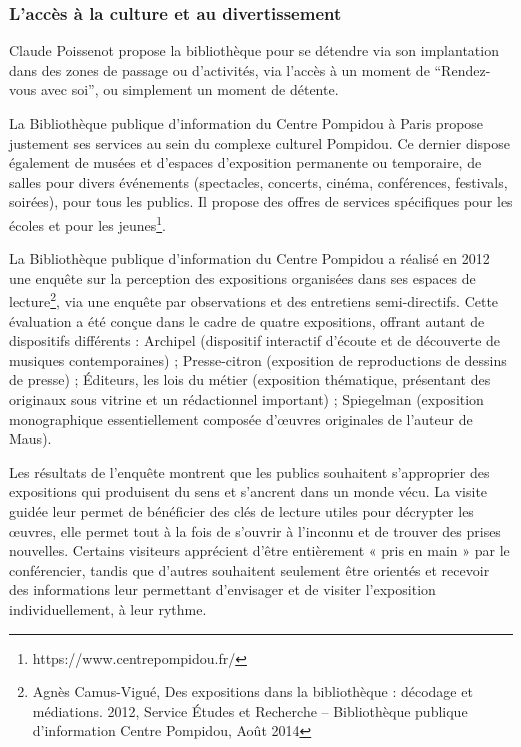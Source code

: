 \documentclass[french,a4paper,12pt]{article}
\begin{document}
\subsubsection{L’accès à la culture et au divertissement}

\quad Claude Poissenot  propose la bibliothèque pour se détendre via son implantation dans des zones de passage ou d’activités, via l’accès à un moment de “Rendez-vous avec soi”, ou simplement un moment de détente. 

La Bibliothèque publique d’information du Centre Pompidou à Paris propose justement ses services au sein du complexe culturel Pompidou. Ce dernier dispose également de musées et d’espaces d’exposition permanente ou temporaire, de salles pour divers événements (spectacles, concerts, cinéma, conférences, festivals, soirées), pour tous les publics. Il propose des offres de services spécifiques pour les écoles et pour les jeunes\footnote{https://www.centrepompidou.fr/}. 

\quad La Bibliothèque publique d’information du Centre Pompidou a réalisé en 2012 une enquête sur la perception des expositions organisées dans ses espaces de lecture\footnote{Agnès Camus-Vigué, Des expositions dans la bibliothèque : décodage et médiations. 2012, Service Études et Recherche – Bibliothèque publique d'information Centre Pompidou, Août 2014}, via une enquête par observations et des entretiens semi-directifs. Cette évaluation a été conçue dans le cadre de quatre expositions, offrant autant de dispositifs différents : Archipel (dispositif interactif d’écoute et de découverte de musiques contemporaines) ; Presse-citron (exposition de reproductions de dessins de presse) ; Éditeurs, les lois du métier (exposition thématique, présentant des originaux sous vitrine et un rédactionnel important) ; Spiegelman (exposition monographique essentiellement composée d’œuvres originales de l’auteur de Maus). 

Les résultats de l’enquête montrent que les publics souhaitent s’approprier des expositions qui produisent du sens et s’ancrent dans un monde vécu. La visite guidée leur permet de bénéficier des clés de lecture utiles pour décrypter les œuvres, elle permet tout à la fois de s’ouvrir à l’inconnu et de trouver des prises nouvelles. Certains visiteurs apprécient d’être entièrement « pris en main » par le conférencier, tandis que d’autres souhaitent seulement être orientés et recevoir des informations leur permettant d'envisager et de visiter l’exposition individuellement, à leur rythme. 
\end{document}

